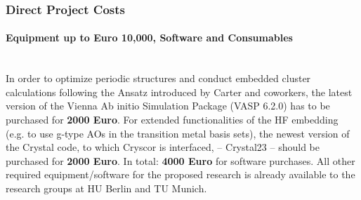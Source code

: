 \documentclass[a4paper,11pt,headings=normal]{scrartcl}
\begin{document}
\subsubsection{Direct Project Costs}
\paragraph{Equipment up to Euro 10,000, Software and Consumables}\ \\
\noindent
In order to optimize periodic structures and conduct embedded cluster calculations following the Ansatz 
introduced by Carter and coworkers, the latest version of the Vienna Ab initio 
Simulation Package (VASP 6.2.0) has to be purchased for \textbf{2000 Euro}. 
For extended functionalities of the HF embedding (e.g. to use g-type AOs in the 
transition metal basis sets), the newest version of the Crystal code, to which 
Cryscor is interfaced, -- Crystal23 -- should be purchased for \textbf{2000 
Euro}. In total: \textbf{4000 Euro} for software purchases.
All other required equipment/software for the proposed research is already 
available to the research groups at HU Berlin and TU Munich.  
\end{document}
